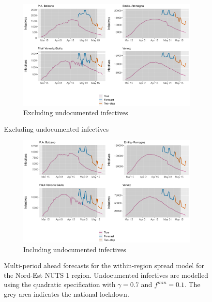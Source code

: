 \documentclass[12pt]{article}
\begin{document}
\begin{appendices}
		\begin{figure}[H]
    	    \centering
    	    \begin{subfigure}{\textwidth}
    	      \centering
    	      \includegraphics[width=0.94\linewidth]{output/model_within_lag14_forecast_full_Nord-Est.pdf}
    	      \caption{Excluding undocumented infectives}
    	      \label{fig:forecast_full_within_nordest_regular}
    	    \end{subfigure}
        \end{figure}
        \begin{figure}[H]\ContinuedFloat
    	    \begin{subfigure}{\textwidth}
    	      \centering
    	      \includegraphics[width=0.94\linewidth]{output/model_within_lag14_forecast_full_Nord-Est_UndocQuadratic.pdf}
    	      \caption{Including undocumented infectives}
    	      \label{fig:forecast_full_within_nordest_undoc}
    	    \end{subfigure}
    	    \caption{Multi-period ahead forecasts for the within-region spread model for the Nord-Est NUTS 1 region. Undocumented infectives are modelled using the quadratic specification with $\gamma = 0.7$ and $f^{min}=0.1$. The grey area indicates the national lockdown.}
    	    \label{fig:forecast_full_within_nordest}
        \end{figure}
        

\end{appendices}
\end{document}
